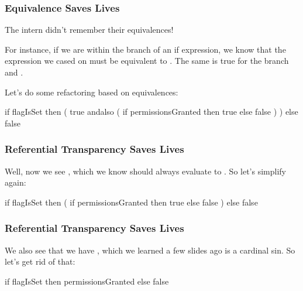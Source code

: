 \documentclass[aspectratio=169]{beamer}
\begin{document}
\begin{frame}[fragile]
  \frametitle{Equivalence Saves Lives}

  The intern didn't remember their equivalences!

  \pause
  \vspace{\fill}

  For instance, if we are within the  branch of
  an if expression, we know that the expression we cased on 
  must be equivalent to . The same is true for
  the  branch and .
   
  \vspace{\fill}

  Let's do some refactoring based on equivalences:
  \pause
  \begin{codeblock}
    if flagIsSet then (
      true andalso ( 
        if permissionsGranted then
          true
        else
          false 
      )
    ) else false
  \end{codeblock}
\end{frame}

\begin{frame}[fragile]
  \frametitle{Referential Transparency Saves Lives}

  Well, now we see , which we know should
  always evaluate to . So let's simplify again:

  \pause
  \vspace{\fill}

  \begin{codeblock}
    if flagIsSet then (
      if permissionsGranted then
        true
      else
        false 
    ) else false
  \end{codeblock}
\end{frame}

\begin{frame}[fragile]
  \frametitle{Referential Transparency Saves Lives}

  We also see that we have ,
  which we learned a few slides ago is a cardinal sin. So let's
  get rid of that:

  \pause
  \vspace{\fill}

  \begin{codeblock}
    if flagIsSet then permissionsGranted
    else false
  \end{codeblock}
\end{frame}
\end{document}
